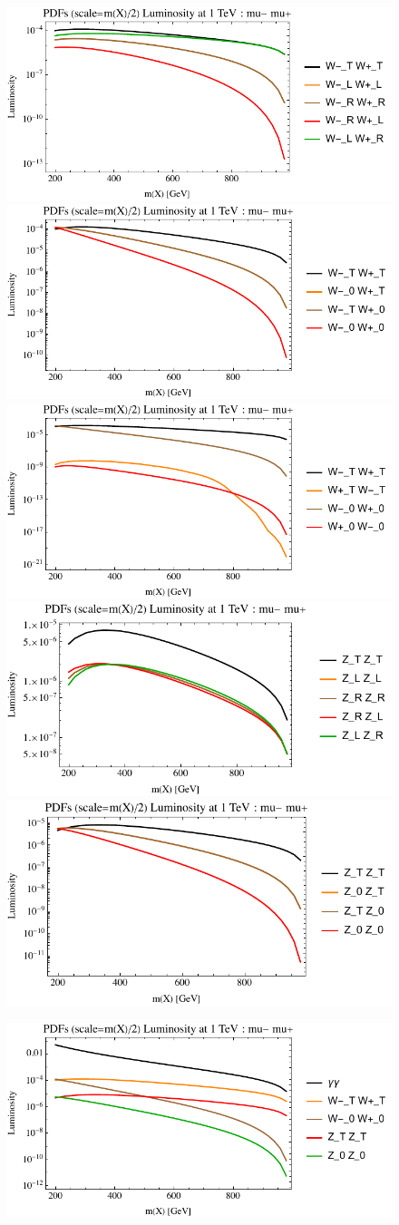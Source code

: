 \documentclass[a4paper,11pt]{article}
\begin{document}
\begin{figure}[ht]
\includegraphics[width=0.46\linewidth]{PlotLumi/1TeV/lumis/plotWWpolRandL.pdf}
\includegraphics[width=0.46\linewidth]{PlotLumi/1TeV/lumis/plotWWpolTand0.pdf}
\includegraphics[width=0.46\linewidth]{PlotLumi/1TeV/lumis/plotWmWpandWpWm.pdf}
\includegraphics[width=0.46\linewidth]{PlotLumi/1TeV/lumis/plotZZpolRandL.pdf}
\includegraphics[width=0.46\linewidth]{PlotLumi/1TeV/lumis/plotZZpolTand0.pdf}
\end{figure}

\begin{figure}
\includegraphics[width=0.46\linewidth]{PlotLumi/1TeV/lumis/plotgammaWZ.pdf}
\end{figure}
\end{document}
